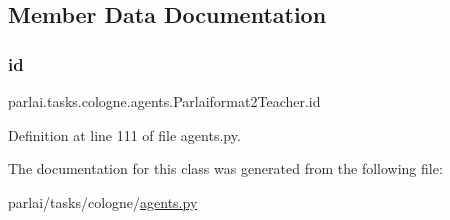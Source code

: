 \subsection{Member Data Documentation}
\mbox{\label{classparlai_1_1tasks_1_1cologne_1_1agents_1_1Parlaiformat2Teacher_a1d6efc35132bbec962c47ae5797ce329}} 
\subsubsection{\texorpdfstring{id}{id}}
{\footnotesize\ttfamily parlai.\+tasks.\+cologne.\+agents.\+Parlaiformat2\+Teacher.\+id}



Definition at line 111 of file agents.\+py.



The documentation for this class was generated from the following file\+:\begin{DoxyCompactItemize}
\item 
parlai/tasks/cologne/\hyperlink{parlai_2tasks_2cologne_2agents_8py}{agents.\+py}\end{DoxyCompactItemize}
